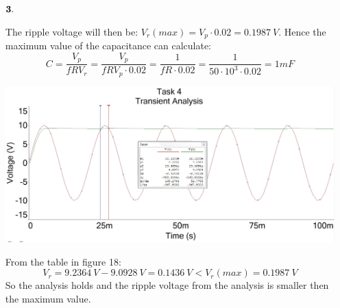 \documentclass[11pt,a4paper]{article}
\begin{document}
\begin{enumerate}
  \item[$\bold{3.}$]
  
  	The ripple voltage will then be: $V_r(max) = V_p \cdot 0.02 = 0.1987\ V$. Hence the maximum value of the capacitance can calculate: $$ C = \dfrac{V_p}{f R V_r} = \dfrac{V_p}{f R V_p \cdot 0.02} = \dfrac{1}{f R \cdot 0.02} = \dfrac{1}{50 \cdot 10^3 \cdot 0.02} = 1mF $$
  	
  	\begin{minipage}{\linewidth}
    	\centering
        \includegraphics[width=15cm]{4_4.jpg}
    \end{minipage}
    \vspace{1em}
    
   From the table in figure 18: $$ V_r = 9.2364 \: V- 9.0928\: V = 0.1436\: V < V_r(max) = 0.1987\: V$$ 
    So the analysis holds and the ripple voltage from the analysis is smaller then the maximum value.
  
\end{enumerate}

  
\end{document}
